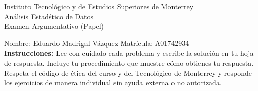 \documentclass[10pt]{report}
\begin{document}
\newpage



\begin{center}
{\large Instituto Tecnol\'{o}gico y de Estudios Superiores de Monterrey \\
An\'alisis Estad\'stico de Datos } \\
Examen Argumentativo (Papel)
\end{center}

Nombre: \underline{\hspace*{.2in}}
Eduardo Madrigal V\'azquez
\underline{\hspace*{.2in}} \quad Matr\'icula:\underline{\hspace*{.2in}}
A01742934
\underline{\hspace*{.2in}} \\

{\bf Instrucciones:} Lee con cuidado cada problema y escribe la soluci\'on
en tu hoja de respuesta. Incluye tu procedimiento que muestre c\'omo obtienes tu respuesta.  Respeta el c\'odigo de \'etica del curso y del Tecnol\'ogico de Monterrey y responde los ejercicios de manera individual sin ayuda externa o no autorizada.
\end{document}
